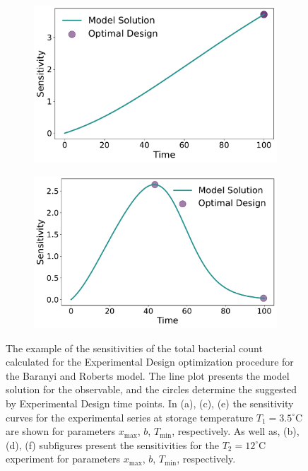 \documentclass[10pt,A4paper]{article}
\begin{document}
\begin{figure}[H]
\begin{subfigure}{.5\textwidth}
        \includegraphics[scale=0.255]{Figures/Sensitivity_Results_baranyi_roberts_ode_fisher_determinant_rel_sensit_cont_2times_2temps_000_x_00_p_02.pdf}
    \end{subfigure}
    \begin{subfigure}{.5\textwidth}
          \centering
          \includegraphics[scale=0.255]{Figures/Sensitivity_Results_baranyi_roberts_ode_fisher_determinant_rel_sensit_cont_2times_2temps_001_x_00_p_02.pdf}
        \end{subfigure}
    \caption{{\footnotesize The example of the sensitivities of the total bacterial count calculated for the Experimental Design optimization procedure for the Baranyi and Roberts model.
    The line plot presents the model solution for the observable, and the circles determine the suggested by Experimental Design time points.
    In (a), (c), (e) the sensitivity curves for the experimental series at storage temperature $T_1=3.5^\circ$C are shown for parameters $x_\text{max}$, $b$, $T_\text{min}$, respectively.
    As well as, (b), (d), (f) subfigures present the sensitivities for the $T_2=12^\circ$C experiment for parameters $x_\text{max}$, $b$, $T_\text{min}$, respectively.}}
    \label{fig:baranyi_roberts_sensitivities}
\end{figure}
\end{document}
